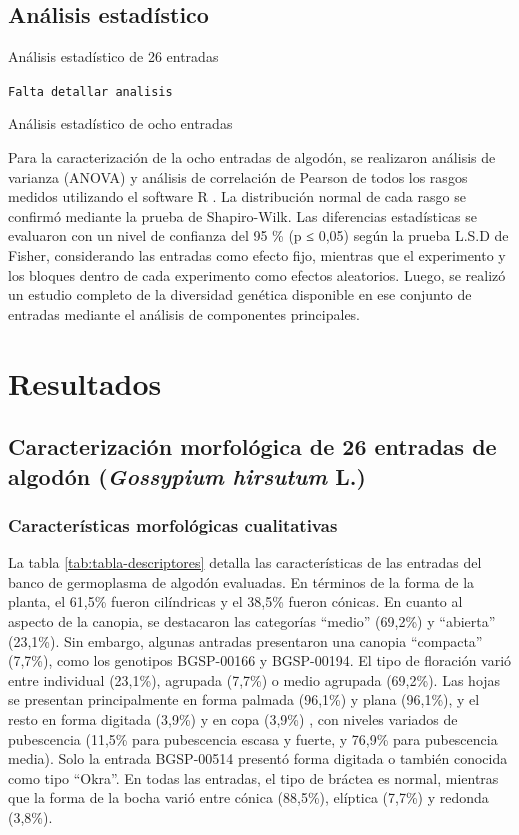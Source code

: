 \documentclass[12pt,oneside]{reedthesis}
\begin{document}
\subsection{Análisis estadístico}\label{anuxe1lisis-estaduxedstico}

Análisis estadístico de 26 entradas

\texttt{Falta\ detallar\ analisis}

Análisis estadístico de ocho entradas

Para la caracterización de la ocho entradas de algodón, se realizaron análisis de varianza (ANOVA) y análisis de correlación de Pearson de todos los rasgos medidos utilizando el software R \autocite{R2024}. La distribución normal de cada rasgo se confirmó mediante la prueba de Shapiro-Wilk. Las diferencias estadísticas se evaluaron con un nivel de confianza del 95 \% (p ≤ 0,05) según la prueba L.S.D de Fisher, considerando las entradas como efecto fijo, mientras que el experimento y los bloques dentro de cada experimento como efectos aleatorios. Luego, se realizó un estudio completo de la diversidad genética disponible en ese conjunto de entradas mediante el análisis de componentes principales.

\section{Resultados}\label{resultados}

\subsection{\texorpdfstring{Caracterización morfológica de 26 entradas de algodón (\emph{Gossypium hirsutum} L.)}{Caracterización morfológica de 26 entradas de algodón (Gossypium hirsutum L.)}}\label{caracterizaciuxf3n-morfoluxf3gica-de-26-entradas-de-algoduxf3n-gossypium-hirsutum-l.-1}

\subsubsection{Características morfológicas cualitativas}\label{caracteruxedsticas-morfoluxf3gicas-cualitativas}

La tabla \ref{tab:tabla-descriptores} detalla las características de las entradas del banco de germoplasma de algodón evaluadas. En términos de la forma de la planta, el 61,5\% fueron cilíndricas y el 38,5\% fueron cónicas. En cuanto al aspecto de la canopia, se destacaron las categorías ``medio'' (69,2\%) y ``abierta'' (23,1\%). Sin embargo, algunas antradas presentaron una canopia ``compacta'' (7,7\%), como los genotipos BGSP-00166 y BGSP-00194. El tipo de floración varió entre individual (23,1\%), agrupada (7,7\%) o medio agrupada (69,2\%). Las hojas se presentan principalmente en forma palmada (96,1\%) y plana (96,1\%), y el resto en forma digitada (3,9\%) y en copa (3,9\%) , con niveles variados de pubescencia (11,5\% para pubescencia escasa y fuerte, y 76,9\% para pubescencia media). Solo la entrada BGSP-00514 presentó forma digitada o también conocida como tipo ``Okra''. En todas las entradas, el tipo de bráctea es normal, mientras que la forma de la bocha varió entre cónica (88,5\%), elíptica (7,7\%) y redonda (3,8\%).
\end{document}
